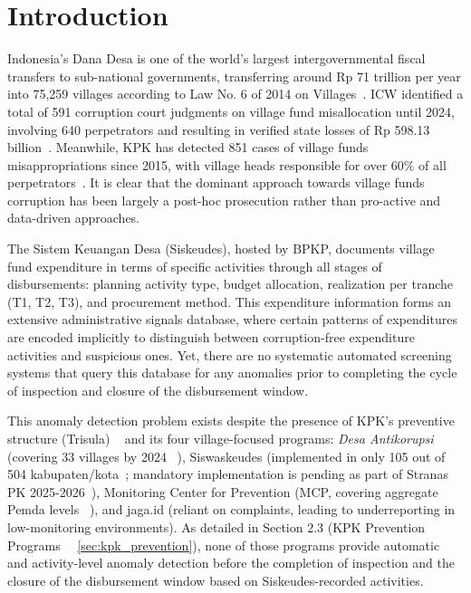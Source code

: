 \documentclass[3p,times,procedia]{elsarticle}
\begin{document}
\vspace*{-6pt}

\section{Introduction}
\label{sec:intro}

Indonesia's Dana Desa is one of the world's largest intergovernmental fiscal transfers to sub-national governments, transferring around Rp 71 trillion per year into 75,259 villages according to Law No. 6 of 2014 on Villages~\cite{ref1}. ICW identified a total of 591 corruption court judgments on village fund misallocation until 2024, involving 640 perpetrators and resulting in verified state losses of Rp 598.13 billion~\cite{ref2}. Meanwhile, KPK has detected 851 cases of village funds misappropriations since 2015, with village heads responsible for over 60\% of all perpetrators~\cite{ref3}. It is clear that the dominant approach towards village funds corruption has been largely a post-hoc prosecution rather than pro-active and data-driven approaches.

The Sistem Keuangan Desa (Siskeudes), hosted by BPKP, documents village fund expenditure in terms of specific activities through all stages of disbursements: planning activity type, budget allocation, realization per tranche (T1, T2, T3), and procurement method. This expenditure information forms an extensive administrative signals database, where certain patterns of expenditures are encoded implicitly to distinguish between corruption-free expenditure activities and suspicious ones. Yet, there are no systematic automated screening systems that query this database for any anomalies prior to completing the cycle of inspection and closure of the disbursement window.

This anomaly detection problem exists despite the presence of KPK's preventive structure (Trisula) ~\cite{ref4} and its four village-focused programs: \textit{Desa Antikorupsi} (covering 33 villages by 2024 ~\cite{ref5}), Siswaskeudes (implemented in only 105 out of 504 kabupaten/kota~\cite{ref6}; mandatory implementation is pending as part of Stranas PK 2025-2026~\cite{ref7}), Monitoring Center for Prevention (MCP, covering aggregate Pemda levels ~\cite{ref8}), and jaga.id (reliant on complaints, leading to underreporting in low-monitoring environments). As detailed in Section 2.3 (KPK Prevention Programs ~\cite{ref9}~\ref{sec:kpk_prevention}), none of those programs provide automatic and activity-level anomaly detection before the completion of inspection and the closure of the disbursement window based on Siskeudes-recorded activities.
\end{document}
